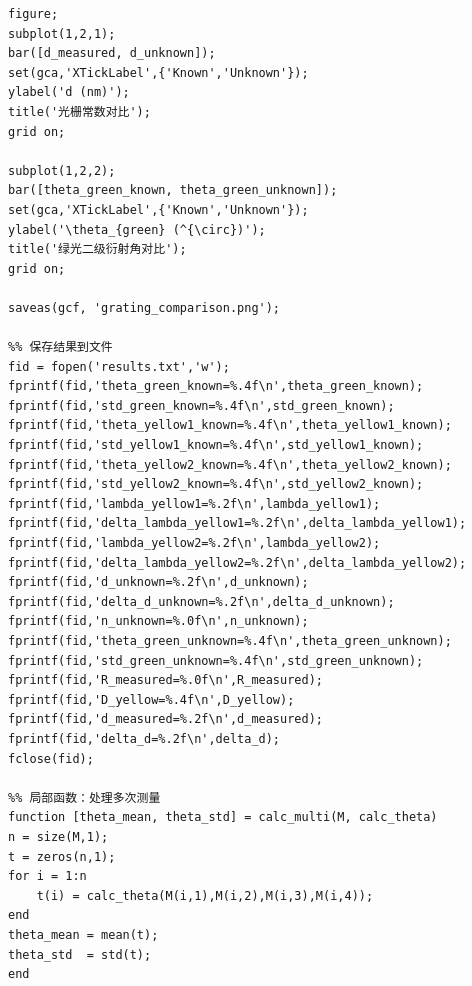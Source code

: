 ﻿\documentclass[12pt,a4paper]{article}
\begin{document}
\begin{lstlisting}[style=Matlab-boxed,caption={光栅实验数据处理代码}]
%% 图 3：已知与未知光栅对比
figure;
subplot(1,2,1);
bar([d_measured, d_unknown]);
set(gca,'XTickLabel',{'Known','Unknown'});
ylabel('d (nm)');
title('光栅常数对比');
grid on;

subplot(1,2,2);
bar([theta_green_known, theta_green_unknown]);
set(gca,'XTickLabel',{'Known','Unknown'});
ylabel('\theta_{green} (^{\circ})');
title('绿光二级衍射角对比');
grid on;

saveas(gcf, 'grating_comparison.png');

%% 保存结果到文件
fid = fopen('results.txt','w');
fprintf(fid,'theta_green_known=%.4f\n',theta_green_known);
fprintf(fid,'std_green_known=%.4f\n',std_green_known);
fprintf(fid,'theta_yellow1_known=%.4f\n',theta_yellow1_known);
fprintf(fid,'std_yellow1_known=%.4f\n',std_yellow1_known);
fprintf(fid,'theta_yellow2_known=%.4f\n',theta_yellow2_known);
fprintf(fid,'std_yellow2_known=%.4f\n',std_yellow2_known);
fprintf(fid,'lambda_yellow1=%.2f\n',lambda_yellow1);
fprintf(fid,'delta_lambda_yellow1=%.2f\n',delta_lambda_yellow1);
fprintf(fid,'lambda_yellow2=%.2f\n',lambda_yellow2);
fprintf(fid,'delta_lambda_yellow2=%.2f\n',delta_lambda_yellow2);
fprintf(fid,'d_unknown=%.2f\n',d_unknown);
fprintf(fid,'delta_d_unknown=%.2f\n',delta_d_unknown);
fprintf(fid,'n_unknown=%.0f\n',n_unknown);
fprintf(fid,'theta_green_unknown=%.4f\n',theta_green_unknown);
fprintf(fid,'std_green_unknown=%.4f\n',std_green_unknown);
fprintf(fid,'R_measured=%.0f\n',R_measured);
fprintf(fid,'D_yellow=%.4f\n',D_yellow);
fprintf(fid,'d_measured=%.2f\n',d_measured);
fprintf(fid,'delta_d=%.2f\n',delta_d);
fclose(fid);

%% 局部函数：处理多次测量
function [theta_mean, theta_std] = calc_multi(M, calc_theta)
n = size(M,1);
t = zeros(n,1);
for i = 1:n
    t(i) = calc_theta(M(i,1),M(i,2),M(i,3),M(i,4));
end
theta_mean = mean(t);
theta_std  = std(t);
end

\end{lstlisting}
\end{document}
